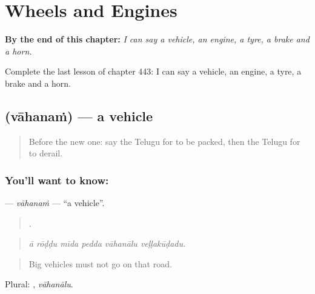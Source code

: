 
\chapter{Wheels and Engines}
\label{ch:te-wheels-and-engines}

\begin{chapteropening}
\textbf{By the end of this chapter:} \emph{I can say a vehicle, an engine, a tyre, a brake and a horn.}

Complete the last lesson of chapter 443: I can say a vehicle, an engine, a tyre, a brake and a horn.
\end{chapteropening}

\section[\texorpdfstring{\te{వాహనం} (vāhanaṁ)}{వాహనం (vāhanaṁ)}]{ (vāhanaṁ) — a vehicle}

\label{lesson:TE-C443-vahanam}



\begin{quote}
Before the new one: say the Telugu for to be packed, then the Telugu for to derail.
\end{quote}

\subsection*{You'll want to know: }
\textbf{} — \emph{vāhanaṁ} — \textquotedblleft{}a vehicle\textquotedblright{}.

\begin{quote}
     .
\end{quote}

\begin{quote}
\emph{ā rōḍḍu mīda pedda vāhanālu veḷḷakūḍadu.}
\end{quote}

\begin{quote}
Big vehicles must not go on that road.
\end{quote}

Plural: , \emph{vāhanālu}.

